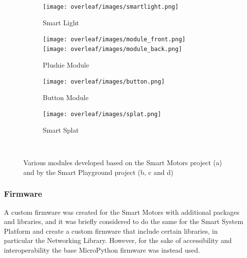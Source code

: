 \begin{figure}[H]
    \centering
    \begin{subfigure}[b]{0.19\textwidth}
        \texttt{[image: overleaf/images/smartlight.png]}
        \caption{Smart Light}
    \end{subfigure}
    \begin{subfigure}[b]{0.38\textwidth}
        \texttt{[image: overleaf/images/module\_front.png]}
        \texttt{[image: overleaf/images/module\_back.png]}
        \caption{Plushie Module}
    \end{subfigure}
    \begin{subfigure}[b]{0.19\textwidth}
        \texttt{[image: overleaf/images/button.png]}
        \caption{Button Module}
    \end{subfigure}
    \begin{subfigure}[b]{0.19\textwidth}
        \texttt{[image: overleaf/images/splat.png]}
        \caption{Smart Splat}
    \end{subfigure}
    \\\vspace{\ftspace}
     \caption{Various modules developed based on the Smart Motors project \citep{blake-west_smart_2025} (a) and by the Smart Playground project \citep{blake-west_smart_2025} (b, c and d)}
    \label{fig:hardware_examples}
\end{figure}

\subsubsection{\label{sec:methods_fw}Firmware}
A custom firmware was created for the Smart Motors with additional packages and libraries, and it was briefly considered to do the same for the Smart System Platform and create a custom firmware that include certain libraries, in particular the Networking Library. However, for the sake of accessibility and interoperability the base MicroPython firmware was instead used.

